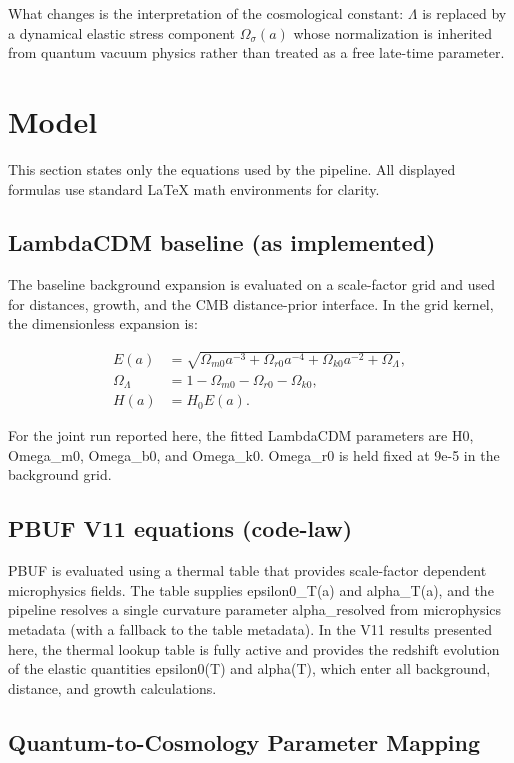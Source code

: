 \documentclass[11pt]{article}
\begin{document}
What changes is the interpretation of the cosmological constant:
\(\Lambda\) is replaced by a dynamical elastic stress component \(\Omega_\sigma(a)\)
whose normalization is inherited from quantum vacuum physics rather than treated as a free late-time parameter.

\section{Model}
This section states only the equations used by the pipeline.
All displayed formulas use standard LaTeX math environments for clarity.

\subsection{LambdaCDM baseline (as implemented)}
The baseline background expansion is evaluated on a scale-factor grid and used for distances, growth, and the CMB distance-prior interface.
In the grid kernel, the dimensionless expansion is:

\begin{align}
E(a) &= \sqrt{\Omega_{m0} a^{-3} + \Omega_{r0} a^{-4} + \Omega_{k0} a^{-2} + \Omega_\Lambda},\\
\Omega_\Lambda &= 1 - \Omega_{m0} - \Omega_{r0} - \Omega_{k0},\\
H(a) &= H_0 E(a).
\end{align}

For the joint run reported here, the fitted LambdaCDM parameters are H0, Omega\_m0, Omega\_b0, and Omega\_k0.
Omega\_r0 is held fixed at 9e-5 in the background grid.

\subsection{PBUF V11 equations (code-law)}
PBUF is evaluated using a thermal table that provides scale-factor dependent microphysics fields.
The table supplies epsilon0\_T(a) and alpha\_T(a), and the pipeline resolves a single curvature parameter alpha\_resolved from microphysics metadata (with a fallback to the table metadata).
In the V11 results presented here, the thermal lookup table is fully active and provides the redshift evolution of the elastic quantities epsilon0(T) and alpha(T), which enter all background, distance, and growth calculations.

\subsection{Quantum-to-Cosmology Parameter Mapping}
\end{document}
